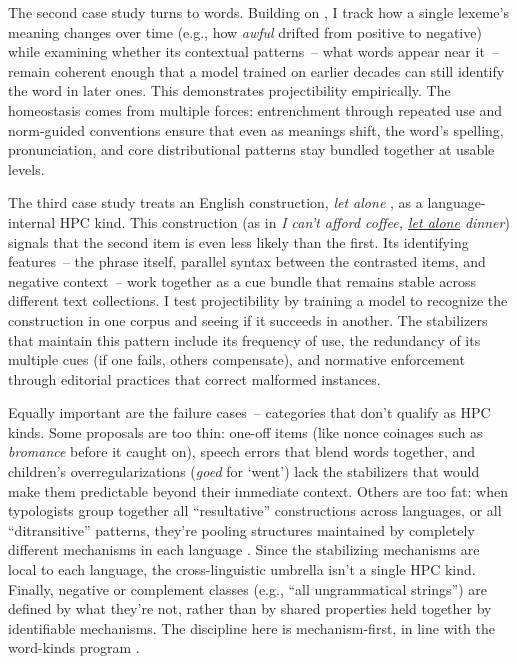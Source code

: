 \documentclass[12pt]{article}
\begin{document}
The second case study turns to words. Building on \citet{Miller2021WordsSpeciesKinds}, I track how a single lexeme's meaning changes over time (e.g., how \textit{awful} drifted from positive to negative) while examining whether its contextual patterns~-- what words appear near it~-- remain coherent enough that a model trained on earlier decades can still identify the word in later ones. This demonstrates projectibility empirically. The homeostasis comes from multiple forces: entrenchment through repeated use and norm-guided conventions ensure that even as meanings shift, the word's spelling, pronunciation, and core distributional patterns stay bundled together at usable levels.

The third case study treats an English construction, \textit{let alone} \citep{FillmoreKayOConnor1988}, as a language-internal HPC kind. This construction (as in \textit{I can't afford coffee, \uline{let alone} dinner}) signals that the second item is even less likely than the first. Its identifying features~-- the phrase itself, parallel syntax between the contrasted items, and negative context~-- work together as a cue bundle that remains stable across different text collections. I test projectibility by training a model to recognize the construction in one corpus and seeing if it succeeds in another. The stabilizers that maintain this pattern include its frequency of use, the redundancy of its multiple cues (if one fails, others compensate), and normative enforcement through editorial practices that correct malformed instances.

Equally important are the failure cases~-- categories that don't qualify as HPC kinds. Some proposals are too thin: one-off items (like nonce coinages such as \textit{bromance} before it caught on), speech errors that blend words together, and children's overregularizations (\textit{goed} for `went') lack the stabilizers that would make them predictable beyond their immediate context. Others are too fat: when typologists group together all \enquote{resultative} constructions across languages, or all \enquote{ditransitive} patterns, they're pooling structures maintained by completely different mechanisms in each language \citep{Haspelmath2010}. Since the stabilizing mechanisms are local to each language, the cross-linguistic umbrella isn't a single HPC kind. Finally, negative or complement classes (e.g., \enquote{all ungrammatical strings}) are defined by what they're not, rather than by shared properties held together by identifiable mechanisms. The discipline here is mechanism-first, in line with the word-kinds program \citep{Miller2021WordsSpeciesKinds}.
\end{document}
